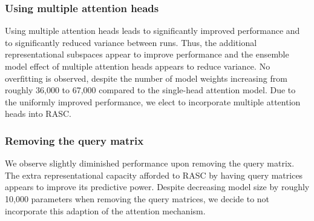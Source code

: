 %
\subsubsection{Using multiple attention heads} \label{subsubsec:result_heads}
Using multiple attention heads leads to significantly improved performance and to significantly reduced variance between runs. Thus, the additional representational subspaces appear to improve performance and the ensemble model effect of multiple attention heads appears to reduce variance. No overfitting is observed, despite the number of model weights increasing from roughly 36,000 to 67,000 compared to the single-head attention model. Due to the uniformly improved performance, we elect to incorporate multiple attention heads into RASC. 


\subsubsection{Removing the query matrix}  %
We observe slightly diminished performance upon removing the query matrix. The extra representational capacity afforded to RASC by having query matrices appears to improve its predictive power. Despite decreasing model size by roughly 10,000 parameters when removing the query matrices, we decide to not incorporate this adaption of the attention mechanism. 

